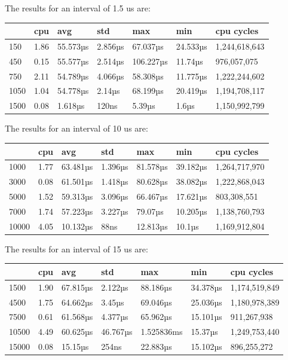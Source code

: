 \documentclass{article}
\begin{document}
The results for an interval of 1.5 us are: \\
\begin{tabular}{lllllll}
\toprule
 & cpu & avg & std & max & min & cpu cycles \\
\midrule
150 & 1.86 & 55.573µs & 2.856µs & 67.037µs & 24.533µs & 1,244,618,643 \\
450 & 0.15 & 55.577µs & 2.514µs & 106.227µs & 11.74µs & 976,057,075 \\
750 & 2.11 & 54.789µs & 4.066µs & 58.308µs & 11.775µs & 1,222,244,602 \\
1050 & 1.04 & 54.778µs & 2.14µs & 68.199µs & 20.419µs & 1,194,708,117 \\
1500 & 0.08 & 1.618µs & 120ns & 5.39µs & 1.6µs & 1,150,992,799 \\
\bottomrule
\end{tabular}


The results for an interval of 10 us are: \\
\begin{tabular}{lllllll}
\toprule
 & cpu & avg & std & max & min & cpu cycles \\
\midrule
1000 & 1.77 & 63.481µs & 1.396µs & 81.578µs & 39.182µs & 1,264,717,970 \\
3000 & 0.08 & 61.501µs & 1.418µs & 80.628µs & 38.082µs & 1,222,868,043 \\
5000 & 1.52 & 59.313µs & 3.096µs & 66.467µs & 17.621µs & 803,308,551 \\
7000 & 1.74 & 57.223µs & 3.227µs & 79.07µs & 10.205µs & 1,138,760,793 \\
10000 & 4.05 & 10.132µs & 88ns & 12.813µs & 10.1µs & 1,169,912,804 \\
\bottomrule
\end{tabular}


The results for an interval of 15 us are: \\
\begin{tabular}{lllllll}
\toprule
 & cpu & avg & std & max & min & cpu cycles \\
\midrule
1500 & 1.90 & 67.815µs & 2.122µs & 88.186µs & 34.378µs & 1,174,519,849 \\
4500 & 1.75 & 64.662µs & 3.45µs & 69.046µs & 25.036µs & 1,180,978,389 \\
7500 & 0.61 & 61.568µs & 4.377µs & 65.962µs & 15.101µs & 911,267,938 \\
10500 & 4.49 & 60.625µs & 46.767µs & 1.525836ms & 15.37µs & 1,249,753,440 \\
15000 & 0.08 & 15.15µs & 254ns & 22.883µs & 15.102µs & 896,255,272 \\
\bottomrule
\end{tabular}
\end{document}
